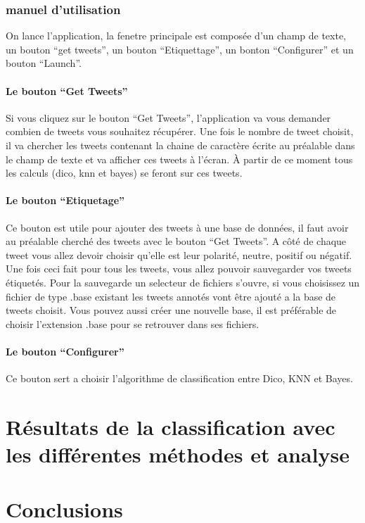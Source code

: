 \documentclass[a4paper,10pt]{report}
\begin{document}
    
    \subsection{manuel d'utilisation}
      On lance l'application, la fenetre principale est composée d'un champ de texte, un bouton ``get tweets'', un bouton ``Etiquettage'', un bonton ``Configurer'' et 
      un bouton ``Launch''.
      \subsubsection{Le bouton ``Get Tweets''}
	Si vous cliquez sur le bouton ``Get Tweets'', l'application va vous demander combien de tweets vous souhaitez récupérer. Une fois le nombre de tweet choisit,
	il va chercher les tweets contenant la chaine de caractère écrite au préalable dans le champ de texte et va afficher ces tweets à l'écran.
	À partir de ce moment tous les calculs (dico, knn et bayes) se feront sur ces tweets.
      \subsubsection{Le bouton ``Etiquetage''}
	Ce bouton est utile pour ajouter des tweets à une base de données, il faut avoir au préalable cherché des tweets avec le bouton ``Get Tweets''.
	A côté de chaque tweet vous allez devoir choisir qu'elle est leur polarité, neutre, positif ou négatif. Une fois ceci fait pour tous les tweets, vous 
	allez pouvoir sauvegarder vos tweets étiquetés. Pour la sauvegarde un selecteur de fichiers s'ouvre, si vous choisissez un fichier de type .base existant
	les tweets annotés vont être ajouté a la base de tweets choisit. Vous pouvez aussi créer une nouvelle base, il est préférable de choisir l'extension .base
	pour se retrouver dans ses fichiers.
      \subsubsection{Le bouton ``Configurer''}
	Ce bouton sert a choisir l'algorithme de classification entre Dico, KNN et Bayes. 
\chapter{Résultats de la classification avec les différentes méthodes et analyse}
\chapter{Conclusions}
\end{document}
